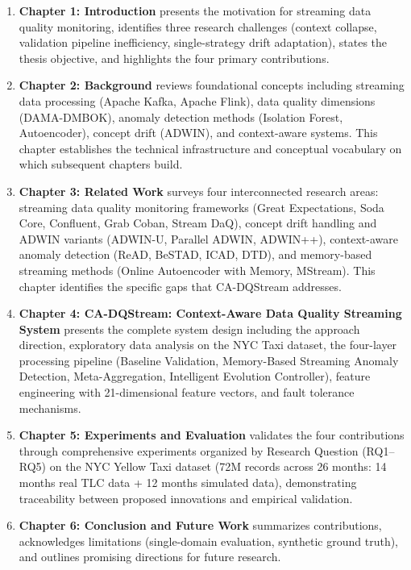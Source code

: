 \begin{enumerate}
    \item \textbf{Chapter 1: Introduction} presents the motivation for streaming data quality monitoring, identifies three research challenges (context collapse, validation pipeline inefficiency, single-strategy drift adaptation), states the thesis objective, and highlights the four primary contributions.

    \item \textbf{Chapter 2: Background} reviews foundational concepts including streaming data processing (Apache Kafka, Apache Flink), data quality dimensions (DAMA-DMBOK), anomaly detection methods (Isolation Forest, Autoencoder), concept drift (ADWIN), and context-aware systems. This chapter establishes the technical infrastructure and conceptual vocabulary on which subsequent chapters build.

    \item \textbf{Chapter 3: Related Work} surveys four interconnected research areas: streaming data quality monitoring frameworks (Great Expectations, Soda Core, Confluent, Grab Coban, Stream DaQ), concept drift handling and ADWIN variants (ADWIN-U, Parallel ADWIN, ADWIN++), context-aware anomaly detection (ReAD, BeSTAD, ICAD, DTD), and memory-based streaming methods (Online Autoencoder with Memory, MStream). This chapter identifies the specific gaps that CA-DQStream addresses.

    \item \textbf{Chapter 4: CA-DQStream: Context-Aware Data Quality Streaming System} presents the complete system design including the approach direction, exploratory data analysis on the NYC Taxi dataset, the four-layer processing pipeline (Baseline Validation, Memory-Based Streaming Anomaly Detection, Meta-Aggregation, Intelligent Evolution Controller), feature engineering with 21-dimensional feature vectors, and fault tolerance mechanisms.

    \item \textbf{Chapter 5: Experiments and Evaluation} validates the four contributions through comprehensive experiments organized by Research Question (RQ1--RQ5) on the NYC Yellow Taxi dataset (72M records across 26 months: 14 months real TLC data + 12 months simulated data), demonstrating traceability between proposed innovations and empirical validation.

    \item \textbf{Chapter 6: Conclusion and Future Work} summarizes contributions, acknowledges limitations (single-domain evaluation, synthetic ground truth), and outlines promising directions for future research.
\end{enumerate}
